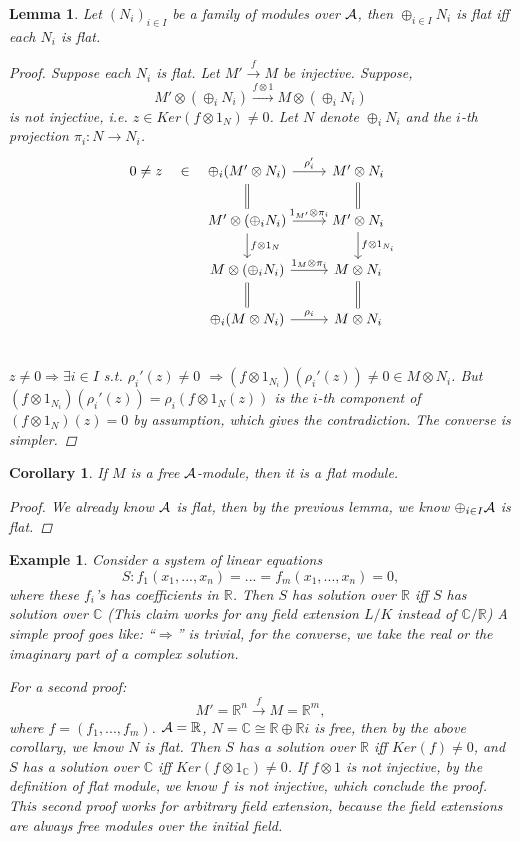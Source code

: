 \documentclass[11pt]{article}
\newtheorem{lemma}[thm]{Lemma}
\newtheorem{cor}[thm]{Corollary}
\newtheorem{ex}[thm]{Example}
\newcommand{\reals}{\mathbb R}
\newcommand{\cplx}{\mathbb C}
\newcommand{\cala}{{\cal A}}
\newcommand{\Lrta}{\Longrightarrow}
\newcommand{\lrta}{\longrightarrow}
\begin{document}
\begin{lemma}
Let $(N_i)_{i\in I}$ be a family of modules over $\cala$, then $\oplus_{i\in I} N_i$ is flat iff each $N_i$ is flat.
\begin{proof}
Suppose each $N_i$ is flat. Let $M'\overset{f}{\lrta}M$ be injective. Suppose, 
$$
M'\otimes(\oplus_{i}N_i)\overset{f\otimes 1}{\lrta}M\otimes (\oplus_i N_i) 
$$
is not injective, i.e.  $z\in Ker(f\otimes 1_N)\neq 0$. 
Let $N$ denote $\oplus_i N_i$ and the $i$-th projection $\pi_i:N\lrta N_i$.
\[
\begin{tikzcd}
0\neq z\arrow[r,phantom,"\in"] & \oplus_i (M'\otimes N_i)\arrow[r,"\rho_i'"] \arrow[d,equal] & M'\otimes N_i\arrow[d,equal] \\
& M'\otimes(\oplus_i N_i)\arrow[r,"1_{M'}\otimes \pi_i"] \arrow[d,"f\otimes 1_N"] & M'\otimes N_i \arrow[d,"f\otimes 1_{N_i}"] \\
& M\otimes (\oplus_i N_i)\arrow[r,"1_M\otimes \pi_i"] & M\otimes  N_i\\
& \oplus_i (M\otimes N_i)\arrow[r,"\rho_i"] \arrow[u,equal] & M\otimes N_i\arrow[u,equal] \\
\end{tikzcd}
\]
$z\neq 0\Lrta \exists i\in I$ s.t. $\rho_i'(z)\neq0$ $\Lrta (f\otimes 1_{N_i})(\rho_i'(z))\neq0\in M\otimes N_i$.
But $(f\otimes 1_{N_i})(\rho_i'(z))=\rho_i(f\otimes 1_{N}(z))$ is the $i$-th component of $(f\otimes1_N)(z)=0$ by assumption, which gives the contradiction.
The converse is simpler.
\end{proof} 
\end{lemma}
\begin{cor}
If $M$ is a free $\cala$-module, then it is a flat module.
\begin{proof}
We already know $\cala$ is flat, then by the previous lemma, we know $\oplus_{i\in I}\cala$ is flat.
\end{proof}
\end{cor}

\begin{ex}
Consider a system of linear equations
$$
S:f_1(x_1,...,x_n)=...=f_m(x_1,...,x_n)=0,
$$
where these $f_i$'s has coefficients in $\reals$. Then $S$ has solution over $\reals$ iff $S$ has solution over $\cplx$ (This claim works for any field extension $L/K$ instead of  $\cplx/\reals$)
A simple proof goes like: ``$\Lrta$'' is trivial, for the converse, we take the real or the imaginary part of a complex solution. 

For a second proof:
$$
M'=\reals^n\overset{f}{\lrta} M=\reals^m,
$$
where $f=(f_1,...,f_m)$.
$\cala=\reals$, $ N=\cplx\cong \reals\oplus \reals i$ is free, then by the above corollary, we know $N$ is flat.
Then $S$ has a solution over $\reals$ iff $Ker(f)\neq 0$, and $S$ has a solution over $\cplx$ iff $Ker(f\otimes 1_\cplx)\neq 0$. If $f\otimes 1$ is not injective, by the definition of flat module, we know $f$ is not injective, which conclude the proof. This second proof works for arbitrary field extension, because the field extensions are always free modules over the initial field.
\end{ex}
\end{document}
